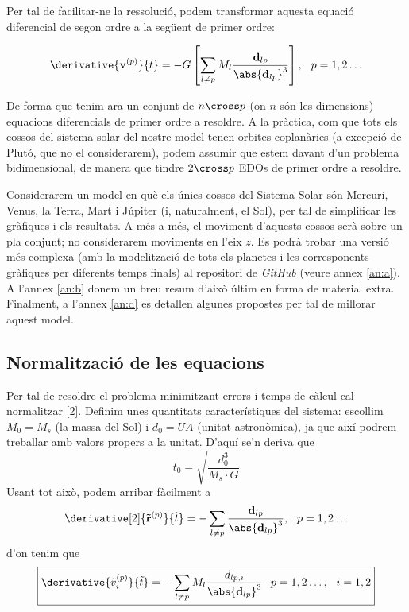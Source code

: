 \documentclass[10pt, twoside, a4paper]{article}
\begin{document}
Per tal de facilitar-ne la ressolució, podem transformar aquesta equació diferencial de segon ordre a la següent de primer ordre:

\begin{equation}
    \derivative{\mathbf{v}^{(p)}}{t} = -G \left[ \sum_{l \neq p} M_l\frac{\mathbf{d}_{lp}}{\abs{\mathbf{d}_{lp}}^3}\right], \hspace{0.25cm} p = 1,2 \ldots \label{2}
\end{equation}

De forma que tenim ara un conjunt de $n \cross p$ (on $n$ són les dimensions) equacions diferencials de primer ordre a resoldre. A la pràctica, com que tots els cossos del sistema solar del nostre model tenen orbites coplanàries (a excepció de Plutó, que no el considerarem), podem assumir que estem davant d'un problema bidimensional, de manera que tindre $2 \cross p$ EDOs de primer ordre a resoldre.

Considerarem un model en què els únics cossos del Sistema Solar són Mercuri, Venus, la Terra, Mart i Júpiter (i, naturalment, el Sol), per tal de simplificar les gràfiques i els resultats. A més a més, el moviment d'aquests cossos serà sobre un pla conjunt; no considerarem moviments en l'eix $z$. Es podrà trobar una versió més complexa (amb la modelització de tots els planetes i les corresponents gràfiques per diferents temps finals) al repositori de \textit{GitHub} (veure annex \ref{an:a}). A l'annex \ref{an:b} donem un breu resum d'això últim en forma de material extra. Finalment, a l'annex \ref{an:d} es detallen algunes propostes per tal de millorar aquest model.

\subsection{Normalització de les equacions}
Per tal de resoldre el problema minimitzant errors i temps de càlcul cal normalitzar \eqref{2}. Definim unes quantitats característiques del sistema: escollim $M_0 = M_s$ (la massa del Sol) i $d_0 = UA$ (unitat astronòmica), ja que així podrem treballar amb valors propers a la unitat. D'aquí se'n deriva que
\begin{equation*}
    t_0 = \sqrt{\frac{d_0^3}{M_s \cdot G}}
\end{equation*}
Usant tot això, podem arribar fàcilment a 
\begin{equation}
    \derivative[2]{\mathbf{\tilde{r}}^{(p)}}{\tilde{t}} = - \sum_{l \neq p} \frac{\mathbf{d}_{lp}}{\abs{\mathbf{d}_{lp}}^3}, \hspace{0.25cm} p = 1,2 \ldots
\end{equation}
d'on tenim que
\begin{equation}
    \boxed{\derivative{\tilde{v}_i^{(p)}}{\tilde{t}} = - \sum_{l \neq p} M_l \frac{d_{lp,i}}{\abs{\mathbf{d}_{lp}}^3} \hspace{0.25cm} p = 1,2 \ldots, \hspace{0.25cm} i = 1, 2} \label{eq5}
\end{equation}
\end{document}
